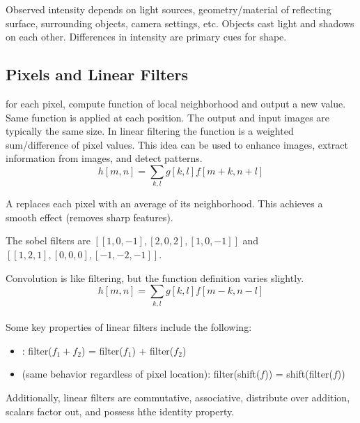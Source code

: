 \documentclass{article}
\begin{document}
Observed intensity depends on light sources, geometry/material of reflecting surface, surrounding objects, camera settings, etc. Objects cast light and shadows on each other. Differences in intensity are primary cues for shape. 

\subsection{Pixels and Linear Filters}

\begin{definition}
  for each pixel, compute function of local neighborhood and output a new value. Same function is applied at each position. The output and input images are typically the same size. In linear filtering the function is a weighted sum/difference of pixel values. This idea can be used to enhance images, extract information from images, and detect patterns. $$h[m,n] = \sum_{k,l}g[k,l]f[m+k,n+l]$$
\end{definition}

A  replaces each pixel with an average of its neighborhood. This achieves a smooth effect (removes sharp features). 

\begin{remark}
  The sobel filters are $[[1,0,-1],[2,0,2],[1,0,-1]]$ and $[[1,2,1],[0,0,0],[-1,-2,-1]]$. 
\end{remark}

Convolution is like filtering, but the function definition varies slightly. $$h[m,n] = \sum_{k,l}g[k,l]f[m-k,n-l]$$ \\ Some key properties of linear filters include the following: 
\begin{itemize}
  \item {}: filter($f_1 + f_2$) = filter($f_1$) + filter($f_2$)
  \item {} (same behavior regardless of pixel location): filter(shift($f$)) = shift(filter($f$))
\end{itemize}
Additionally, linear filters are commutative, associative, distribute over addition, scalars factor out, and possess hthe identity property. 
\end{document}

